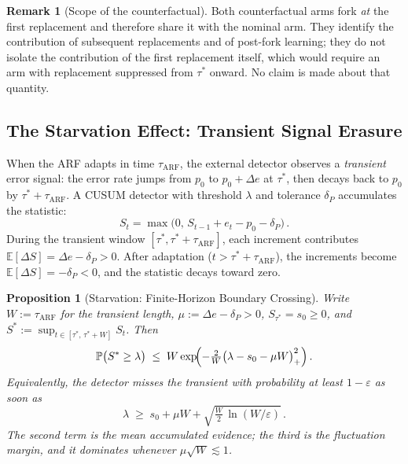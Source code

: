 \documentclass[10pt,conference]{IEEEtran}
\newtheorem{proposition}[theorem]{Proposition}
\theoremstyle{definition}
\newtheorem{remark}[theorem]{Remark}
\begin{document}
\begin{remark}[Scope of the counterfactual]\label{rem:cf_scope}
  Both counterfactual arms fork \emph{at} the first replacement and therefore share it with the nominal arm. They identify the contribution of subsequent replacements and of post-fork learning; they do not isolate the contribution of the first replacement itself, which would require an arm with replacement suppressed from $\tau^*$ onward. No claim is made about that quantity.
\end{remark}

\subsection{The Starvation Effect: Transient Signal Erasure}\label{sec:starvation}

When the ARF adapts in time $\tau_{\mathrm{ARF}}$, the external detector observes a \emph{transient} error signal: the error rate jumps from $p_0$ to $p_0 + \Delta e$ at $\tau^*$, then decays back to $p_0$ by $\tau^* + \tau_{\mathrm{ARF}}$.
A CUSUM detector with threshold $\lambda$ and tolerance $\delta_P$ accumulates the statistic:
\begin{equation}\label{eq:cusum}
  S_t = \max\bigl(0,\, S_{t-1} + e_t - p_0 - \delta_P\bigr)\,.
\end{equation}
During the transient window $[\tau^*, \tau^* + \tau_{\mathrm{ARF}}]$, each increment contributes $\mathbb{E}[\Delta S] = \Delta e - \delta_P > 0$.
After adaptation ($t > \tau^* + \tau_{\mathrm{ARF}}$), the increments become $\mathbb{E}[\Delta S] = -\delta_P < 0$, and the statistic decays toward zero.

\begin{proposition}[Starvation: Finite-Horizon Boundary Crossing]\label{prop:starvation}
  Write $W := \tau_{\mathrm{ARF}}$ for the transient length, $\mu := \Delta e - \delta_P > 0$, $S_{\tau^*} = s_0 \ge 0$, and $S^* := \sup_{t\in[\tau^*,\, \tau^* + W]} S_t$. Then
  \begin{equation}\label{eq:markov_bound}
    \mathbb{P}\bigl(S^* \ge \lambda\bigr) \;\le\; W \exp\!\Bigl(-\tfrac{2}{W}\bigl(\lambda - s_0 - \mu W\bigr)_{+}^{2}\Bigr)\,.
  \end{equation}
  Equivalently, the detector misses the transient with probability at least $1-\varepsilon$ as soon as
  \begin{equation}\label{eq:starve_boundary}
    \lambda \;\ge\; s_0 + \mu W + \sqrt{\tfrac{W}{2}\,\ln(W/\varepsilon)}\,.
  \end{equation}
  The second term is the mean accumulated evidence; the third is the fluctuation margin, and it dominates whenever $\mu\sqrt{W} \lesssim 1$.
\end{proposition}
\end{document}
